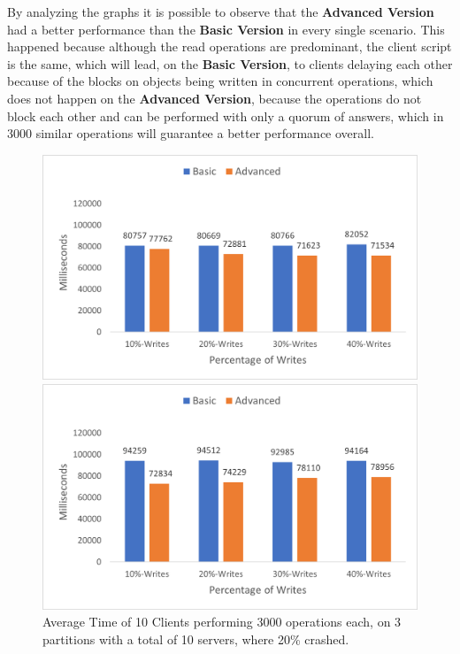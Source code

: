 \documentclass[times, 10pt,twocolumn]{article}
\begin{document}
By analyzing the graphs it is possible to observe that the \textbf{Advanced Version} had a better performance than the \textbf{Basic Version} in every single scenario. This happened because although the read operations are predominant, the client script is the same, which will lead, on the \textbf{Basic Version},  to clients delaying each other because of the blocks on objects being written in concurrent operations, which does not happen on the \textbf{Advanced Version}, because the operations do not block each other and can be performed with only a quorum of answers, which in 3000 similar operations will guarantee a better performance overall.
\newpage
\begin{figure}[h!]
	\centering
	\includegraphics[scale=0.65]{Graphs/Client-10-20.png}
	\caption{Average Time of 10 Clients performing 3000 operations each, on 3 partitions with a total of 10 servers, where 20\% crashed.}
	\vspace{0.15in}
	\centering
	\includegraphics[scale=0.65]{Graphs/Client-10-40.png}

\end{figure}
\end{document}
